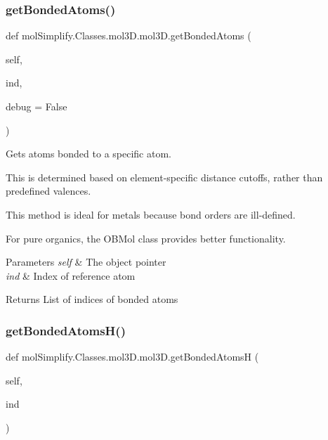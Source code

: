 \subsubsection{\texorpdfstring{get\+Bonded\+Atoms()}{getBondedAtoms()}}
{\footnotesize\ttfamily def mol\+Simplify.\+Classes.\+mol3\+D.\+mol3\+D.\+get\+Bonded\+Atoms (\begin{DoxyParamCaption}\item[{}]{self,  }\item[{}]{ind,  }\item[{}]{debug = {\ttfamily False} }\end{DoxyParamCaption})}



Gets atoms bonded to a specific atom. 

This is determined based on element-\/specific distance cutoffs, rather than predefined valences.

This method is ideal for metals because bond orders are ill-\/defined.

For pure organics, the O\+B\+Mol class provides better functionality. 
\begin{DoxyParams}{Parameters}
{\em self} & The object pointer \\
\hline
{\em ind} & Index of reference atom \\
\hline
\end{DoxyParams}
\begin{DoxyReturn}{Returns}
List of indices of bonded atoms 
\end{DoxyReturn}
\mbox{\label{classmolSimplify_1_1Classes_1_1mol3D_1_1mol3D_ac8ef262050d0ef901688e7c282448fa6}} 
\subsubsection{\texorpdfstring{get\+Bonded\+Atoms\+H()}{getBondedAtomsH()}}
{\footnotesize\ttfamily def mol\+Simplify.\+Classes.\+mol3\+D.\+mol3\+D.\+get\+Bonded\+AtomsH (\begin{DoxyParamCaption}\item[{}]{self,  }\item[{}]{ind }\end{DoxyParamCaption})}



